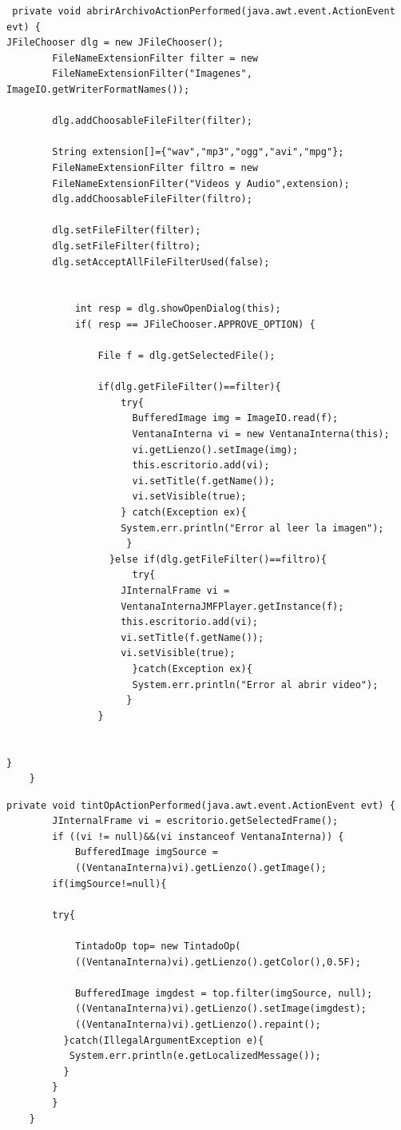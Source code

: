 \begin{lstlisting}
 private void abrirArchivoActionPerformed(java.awt.event.ActionEvent evt) {
JFileChooser dlg = new JFileChooser();
        FileNameExtensionFilter filter = new 
        FileNameExtensionFilter("Imagenes", ImageIO.getWriterFormatNames());
      
        dlg.addChoosableFileFilter(filter);
        
        String extension[]={"wav","mp3","ogg","avi","mpg"};  
        FileNameExtensionFilter filtro = new 
        FileNameExtensionFilter("Videos y Audio",extension);
        dlg.addChoosableFileFilter(filtro);
       
        dlg.setFileFilter(filter);
        dlg.setFileFilter(filtro);
        dlg.setAcceptAllFileFilterUsed(false);
        
        
            int resp = dlg.showOpenDialog(this);
            if( resp == JFileChooser.APPROVE_OPTION) {
                
                File f = dlg.getSelectedFile();
                
                if(dlg.getFileFilter()==filter){
                    try{
                      BufferedImage img = ImageIO.read(f);
                      VentanaInterna vi = new VentanaInterna(this);
                      vi.getLienzo().setImage(img);
                      this.escritorio.add(vi);
                      vi.setTitle(f.getName());
                      vi.setVisible(true);
                    } catch(Exception ex){ 
                    System.err.println("Error al leer la imagen");
                     }
                  }else if(dlg.getFileFilter()==filtro){
                      try{
                    JInternalFrame vi = 
                    VentanaInternaJMFPlayer.getInstance(f);
                    this.escritorio.add(vi);
                    vi.setTitle(f.getName());
                    vi.setVisible(true);
                      }catch(Exception ex){ 
                      System.err.println("Error al abrir video");
                     }
                }
                

}
    }
\end{lstlisting}
\begin{lstlisting}
private void tintOpActionPerformed(java.awt.event.ActionEvent evt) {
        JInternalFrame vi = escritorio.getSelectedFrame();
        if ((vi != null)&&(vi instanceof VentanaInterna)) {
            BufferedImage imgSource = 
            ((VentanaInterna)vi).getLienzo().getImage();
        if(imgSource!=null){
            
        try{
            
            TintadoOp top= new TintadoOp(
            ((VentanaInterna)vi).getLienzo().getColor(),0.5F);
            
            BufferedImage imgdest = top.filter(imgSource, null);
            ((VentanaInterna)vi).getLienzo().setImage(imgdest);
            ((VentanaInterna)vi).getLienzo().repaint();
          }catch(IllegalArgumentException e){
           System.err.println(e.getLocalizedMessage());
          }
        }
        } 
    }
\end{lstlisting}
